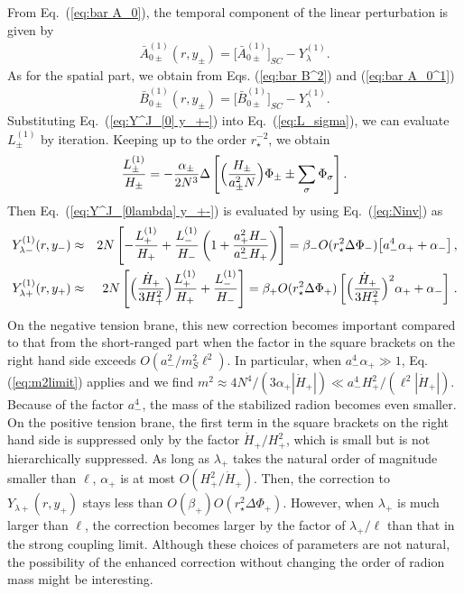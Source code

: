 \documentclass[a4paper,showpacs,preprintnumbers,amsmath,amssymb]{revtex4}
\begin{document}
From Eq.~(\ref{eq:bar A_0}), the temporal component of the linear perturbation is given by 
\begin{eqnarray}
  \bar A^{(1)} _{0\pm}(r,y_{\pm})
   =  \bigl[ \bar A^{(1)} _{0\pm}\bigr]_{SC} 
     -  Y^{(1)}_{\lambda}.  
\label{eq:bar A_0^1}
\end{eqnarray}
As for the spatial part, we obtain from Eqs. (\ref{eq:bar B^2}) and (\ref{eq:bar A_0^1}) 
\begin{eqnarray}
  \bar B^{(1)} _{0\pm}(r,y_{\pm})
   =  \bigl[ \bar B^{(1)} _{0\pm}\bigr]_{SC}
     -  Y^{(1)}_{\lambda}.  
\label{eq:bar B_0^1}
\end{eqnarray}
Substituting Eq.~(\ref{eq:Y^J_[0] y_+-}) into Eq.~(\ref{eq:L_sigma}), we can evaluate $L_\pm^{(1)}$ by iteration. Keeping up to the order
$r_\star^{-2}$, we obtain  
\begin{eqnarray}
    \frac{L^{(1)}_\pm }{ H_\pm } = 
    - \frac{ \alpha_\pm }{ 2N^3 } \Delta 
     \left[
       \Bigl( \frac{H_\pm}{a^2_\pm N} \Bigr) \Phi_\pm \pm  \sum_\sigma \Phi_\sigma  \right]  .
\label{eq:L^1 explicit}
\end{eqnarray}
Then Eq.~(\ref{eq:Y^J_[0lambda] y_+-}) is evaluated by using Eq.~(\ref{eq:Ninv}) as 
\begin{eqnarray}
  Y^{(1)}_{ \lambda -}  (r,y_-) 
  &\approx& 2N   \left[
   - \frac{ L_+^{(1)} }{H_+}
   + \frac{ L_-^{(1)} }{H_-}\left(1+\frac{a^2_+ H_-}{a^2_- H_+}\right)\right] 
   = \beta_-  O (r_\star^2 {\Delta  \Phi_-} ) 
   \bigl[  a_-^4 \alpha_+    +  \alpha_-  \bigr]
  \,,
\label{eq:Y^1_lam - alpha1a}\\
  Y^{(1)}_{ \lambda +}  (r,y_+) 
  &\approx& 2N  \left[
      \Bigl(\frac{\dot H_+}{3H_+^2} \Bigr)  \frac{ L_+^{(1)} }{H_+}
   +  \frac{ L_-^{(1)} }{H_-}\right]   
   = \beta_+  O (r_\star^2 {\Delta  \Phi_+} ) 
     \left[ 
      \Bigl(\frac{\dot H_+}{3H_+^2} \Bigr)^2 \alpha_{+}+\alpha_-\right] \,. 
\label{eq:Y^1_lam - alpha1b} 
\end{eqnarray}
On the negative tension brane, this new correction becomes important compared to that from the short-ranged part when the factor in the square brackets on the right hand side exceeds $O(a_-^2/m_S^2 \ell^2)$.
In particular, when $a_-^4 \alpha_+\gg 1$, Eq. (\ref{eq:m2limit}) applies and we find  $m^2\approx 4N^4/(3 \alpha_+ |\dot H_+|)\ll a_-^4 H^2_+/ ( \ell^{2}|\dot
H_+|)$. 
Because of the factor $a_-^4$, the mass of the stabilized radion becomes even   smaller. 
On the positive tension brane, the first term in the square brackets on the right hand side is suppressed only by the factor $\dot H_+/H_+^2$, which is small but is not hierarchically suppressed. 
As long as $\lambda_+$ takes the natural order of magnitude smaller than
$\ell$, $\alpha_+$ is at most $O(H_+^2/\dot H_+)$. 
Then, the correction to 
$Y_{ \lambda +}(r,y_+)$ stays less than 
$O(\beta_{+})O(r_\star^2 \Delta \Phi_+)$.
However, when $\lambda_+$ is much larger than $\ell$, the correction becomes larger by the factor of $\lambda_+/\ell$ than that in the strong coupling limit. 
Although these choices of parameters are not natural, the possibility of the enhanced correction without changing the order of radion mass might be interesting. 
\end{document}
